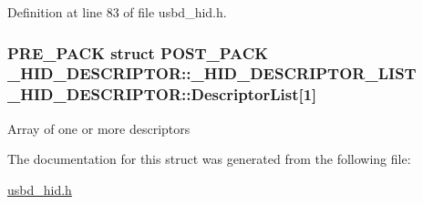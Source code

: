 Definition at line 83 of file usbd\+\_\+hid.\+h.

\subsubsection[{\texorpdfstring{Descriptor\+List}{DescriptorList}}]{\setlength{\rightskip}{0pt plus 5cm}P\+R\+E\+\_\+\+P\+A\+CK struct P\+O\+S\+T\+\_\+\+P\+A\+CK {\bf \+\_\+\+H\+I\+D\+\_\+\+D\+E\+S\+C\+R\+I\+P\+T\+O\+R\+::\+\_\+\+H\+I\+D\+\_\+\+D\+E\+S\+C\+R\+I\+P\+T\+O\+R\+\_\+\+L\+I\+ST}  \+\_\+\+H\+I\+D\+\_\+\+D\+E\+S\+C\+R\+I\+P\+T\+O\+R\+::\+Descriptor\+List\mbox{[}1\mbox{]}}\hypertarget{struct__HID__DESCRIPTOR_ab147b0fb12a4d62db59bb05846a48161}{}\label{struct__HID__DESCRIPTOR_ab147b0fb12a4d62db59bb05846a48161}
Array of one or more descriptors 

The documentation for this struct was generated from the following file\+:\begin{DoxyCompactItemize}
\item 
\hyperlink{usbd__hid_8h}{usbd\+\_\+hid.\+h}\end{DoxyCompactItemize}
